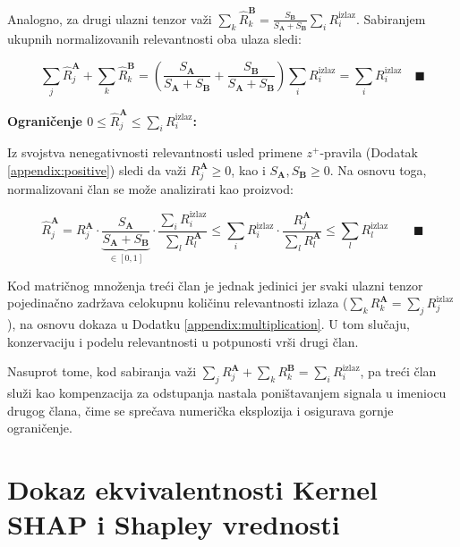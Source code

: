 Analogno, za drugi ulazni tenzor važi $\sum_k \hat{R}_k^{\mathbf{B}} = \frac{S_{\mathbf{B}}}{S_{\mathbf{A}} + S_{\mathbf{B}}} \sum_i R_i^{\text{izlaz}}$. Sabiranjem ukupnih normalizovanih relevantnosti oba ulaza sledi:

\begin{equation*}
    \sum_j \hat{R}_j^{\mathbf{A}} + \sum_k \hat{R}_k^{\mathbf{B}} = \left( \frac{S_{\mathbf{A}}}{S_{\mathbf{A}} + S_{\mathbf{B}}} + \frac{S_{\mathbf{B}}}{S_{\mathbf{A}} + S_{\mathbf{B}}} \right) \sum_i R_i^{\text{izlaz}} = \sum_i R_i^{\text{izlaz}} \quad \blacksquare
\end{equation*}

\textbf{Ograničenje $0 \leq \hat{R}_j^{\mathbf{A}} \leq \sum_i R_i^{\text{izlaz}}$:} 

Iz svojstva nenegativnosti relevantnosti usled primene $z^+$-pravila (Dodatak \ref{appendix:positive}) sledi da važi $R_j^{\mathbf{A}} \geq 0$, kao i $S_{\mathbf{A}}, S_{\mathbf{B}} \geq 0$. Na osnovu toga, normalizovani član se može analizirati kao proizvod:

\begin{equation*}
    \hat{R}_j^{\mathbf{A}} = R_j^{\mathbf{A}} \cdot \underbrace{\frac{S_{\mathbf{A}}}{S_{\mathbf{A}} + S_{\mathbf{B}}}}_{\in [0,1]} \cdot \frac{\sum_i R_i^{\text{izlaz}}}{\sum_l R_l^{\mathbf{A}}} \leq
    \sum_i R_i^{\text{izlaz}} \cdot 
    \frac{R_j^{\mathbf{A}}}{\sum_l R_l^{\mathbf{A}}}
     \leq \sum_l R_l^{\text{izlaz}} \qquad \blacksquare
\end{equation*}

Kod matričnog množenja treći član je jednak jedinici jer svaki ulazni tenzor pojedinačno zadržava celokupnu količinu relevantnosti izlaza ($\sum_k R_k^{\mathbf{A}} = \sum_j R_j^{\text{izlaz}}$), na osnovu dokaza u Dodatku \ref{appendix:multiplication}. U tom slučaju, konzervaciju i podelu relevantnosti u potpunosti vrši drugi član.

Nasuprot tome, kod sabiranja važi $\sum_j R_j^{\mathbf{A}} + \sum_k R_k^{\mathbf{B}} = \sum_i R_i^{\text{izlaz}}$, pa treći član služi kao kompenzacija za odstupanja nastala poništavanjem signala u imeniocu drugog člana, čime se sprečava numerička eksplozija i osigurava gornje ograničenje.

\section{Dokaz ekvivalentnosti Kernel SHAP i Shapley vrednosti}
\label{appendix:kernel_proof}

